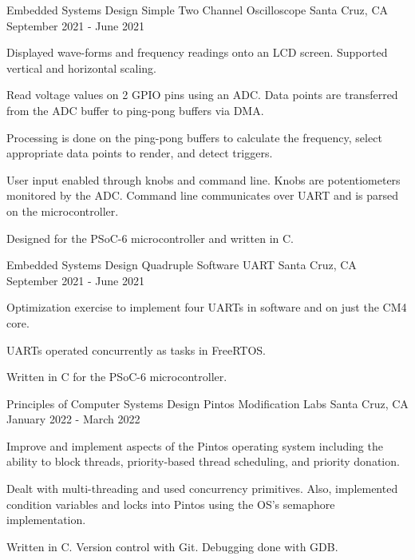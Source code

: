 
\begin{cventries}
  \cventry
    {Embedded Systems Design} %
    {Simple Two Channel Oscilloscope} %
    {Santa Cruz, CA} %
    {September 2021 - June 2021} %
    {
      \begin{cvitems} %
        \item {Displayed wave-forms and frequency readings onto an LCD screen. Supported vertical and horizontal scaling.}
        \item {Read voltage values on 2 GPIO pins using an ADC. Data points are transferred from the ADC buffer to ping-pong buffers via DMA.}
        \item {Processing is done on the ping-pong buffers to calculate the frequency, select appropriate data points to render, and detect triggers.}
        \item {User input enabled through knobs and command line. Knobs are potentiometers monitored by the ADC. Command line communicates over UART and is parsed on the microcontroller.}
      	\item {Designed for the PSoC-6 microcontroller and written in C.}
      \end{cvitems}
    }

  \cventry
    {Embedded Systems Design}
    {Quadruple Software UART}
    {Santa Cruz, CA}
    {September 2021 - June 2021}
    {
        \begin{cvitems}
          \item {Optimization exercise to implement four UARTs in software and on just the CM4 core.}
          \item {UARTs operated concurrently as tasks in FreeRTOS.}
          \item {Written in C for the PSoC-6 microcontroller.}
        \end{cvitems}
    }
       
  \cventry
    {Principles of Computer Systems Design} %
    {Pintos Modification Labs} %
    {Santa Cruz, CA} %
    {January 2022 - March 2022} %
    {
      \begin{cvitems} %
        \item {Improve and implement aspects of the Pintos operating system including the ability to block threads, priority-based thread scheduling, and priority donation.}
        \item {Dealt with multi-threading and used concurrency primitives. Also, implemented condition variables and locks into Pintos using the OS's semaphore implementation.}
        \item {Written in C. Version control with Git. Debugging done with GDB.}
      \end{cvitems}
    }
    

\end{cventries}
